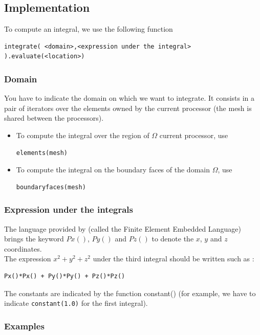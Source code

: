 \subsection{Implementation}

To compute an integral, we use the following function
\begin{lstlisting}
integrate( <domain>,<expression under the integral> ).evaluate(<location>)
\end{lstlisting}

\subsubsection{Domain}

You have to indicate the domain on which we want to integrate. It consists in a pair of iterators over the elements owned by the current processor (the mesh is shared between the processors).
\begin{itemize}
\item To compute the integral over the region of $\Omega$ current processor, use
\begin{lstlisting}
elements(mesh)
\end{lstlisting}
\item To compute the integral on the boundary faces of the domain $\Omega$, use
\begin{lstlisting}
boundaryfaces(mesh)
\end{lstlisting}
\end{itemize}

\subsubsection{Expression under the integrals}

The language provided by \feel (called the Finite Element Embedded Language) brings the keyword $Px()$, $Py()$ and $Pz()$ to denote the $x$, $y$ and $z$ coordinates. \\
The expression $x^2 + y^2 + z^2$ under the third integral should be written such as :
\begin{lstlisting}
Px()*Px() + Py()*Py() + Pz()*Pz()
\end{lstlisting}
\vspace{0.2cm}
The constants are indicated by the function constant() (for example, we have to indicate \lstinline!constant(1.0)! for the first integral). \\

\subsubsection{Examples}

